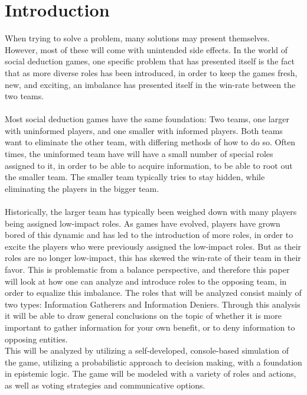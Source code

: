 \section{Introduction}
When trying to solve a problem, many solutions may present themselves. However, 
most of these will come with unintended side effects. In the world of social 
deduction games, one specific problem that has presented itself is the fact 
that as more diverse roles has been introduced, in order to keep the games 
fresh, new, and exciting, an imbalance has presented itself in the win-rate 
between the two teams. \\ \\
Most social deduction games have the same foundation: Two teams, one larger 
with uninformed players, and one smaller with informed players. Both teams want 
to eliminate the other team, with differing methods of how to do so. Often 
times, the uninformed team have will have a small number of special roles 
assigned to it, in order to be able to acquire information, to be able to root 
out the smaller team. The smaller team typically tries to stay hidden, while 
eliminating the players in the bigger team.\\ \\
Historically, the larger team has typically been weighed down with many players 
being assigned low-impact roles. 
As games have evolved, players have grown bored of this dynamic and has led to 
the introduction of more roles, in order to excite the players who were 
previously assigned the low-impact roles. But as their roles are no longer 
low-impact, this has skewed the win-rate of their team in their favor. This is 
problematic from a balance perspective, and therefore this paper will look at 
how one can analyze and introduce roles to the opposing team, in order to 
equalize this imbalance. The roles that will be analyzed consist mainly of two 
types: Information Gatherers and Information Deniers. Through this analysis it 
will be able to draw general conclusions on the topic of whether it is more 
important to gather information for your own benefit, or to deny information to 
opposing entities. \\

This will be analyzed by utilizing a self-developed, console-based simulation
of the game, utilizing a probabilistic approach to decision making, with a
foundation in epistemic logic. The game will be modeled with a variety of roles and actions, as well as voting strategies and communicative options. 

